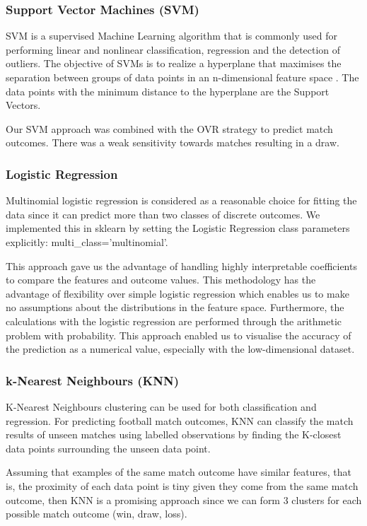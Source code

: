 \documentclass[8pt]{article}
\begin{document}
\subsubsection{Support Vector Machines (SVM)}
SVM is a supervised Machine Learning algorithm that is commonly used for performing linear and nonlinear classification, regression and the detection of outliers. The objective of SVMs is to realize a hyperplane that maximises the separation between groups of data points in an n-dimensional feature space \cite{baeldung}. The data points with the minimum distance to the hyperplane are the Support Vectors.

Our SVM approach was combined with the OVR strategy to predict match outcomes. There was a weak sensitivity towards matches resulting in a draw.

\subsubsection{Logistic Regression}
Multinomial logistic regression is considered as a reasonable choice for fitting the data since it can predict more than two classes of discrete outcomes. We implemented this in sklearn by setting the Logistic Regression class parameters explicitly: multi\_class='multinomial'.

This approach gave us the advantage of handling highly interpretable coefficients to compare the features and outcome values. This methodology has the advantage of flexibility over simple logistic regression which enables us to make no assumptions about the distributions in the feature space. Furthermore, the calculations with the logistic regression are performed through the arithmetic problem with probability. This approach enabled us to visualise the accuracy of the prediction as a numerical value, especially with the low-dimensional dataset.

\subsubsection{k-Nearest Neighbours (KNN)}
K-Nearest Neighbours clustering can be used for both classification and regression. For predicting football match outcomes, KNN can classify the match results of unseen matches using labelled observations by finding the K-closest data points surrounding the unseen data point.

Assuming that examples of the same match outcome have similar features, that is, the proximity of each data point is tiny given they come from the same match outcome, then KNN is a promising approach since we can form 3 clusters for each possible match outcome (win, draw, loss).
\end{document}

